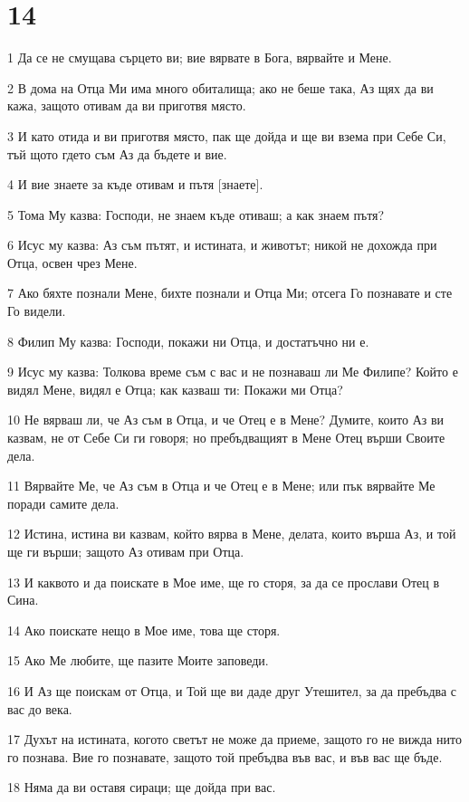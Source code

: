 \chapter{14}

\par 1 Да се не смущава сърцето ви; вие вярвате в Бога, вярвайте и Мене.
\par 2 В дома на Отца Ми има много обиталища; ако не беше така, Аз щях да ви кажа, защото отивам да ви приготвя място.
\par 3 И като отида и ви приготвя място, пак ще дойда и ще ви взема при Себе Си, тъй щото гдето съм Аз да бъдете и вие.
\par 4 И вие знаете за къде отивам и пътя [знаете].
\par 5 Тома Му казва: Господи, не знаем къде отиваш; а как знаем пътя?
\par 6 Исус му казва: Аз съм пътят, и истината, и животът; никой не дохожда при Отца, освен чрез Мене.
\par 7 Ако бяхте познали Мене, бихте познали и Отца Ми; отсега Го познавате и сте Го видели.
\par 8 Филип Му казва: Господи, покажи ни Отца, и достатъчно ни е.
\par 9 Исус му казва: Толкова време съм с вас и не познаваш ли Ме Филипе? Който е видял Мене, видял е Отца; как казваш ти: Покажи ми Отца?
\par 10 Не вярваш ли, че Аз съм в Отца, и че Отец е в Мене? Думите, които Аз ви казвам, не от Себе Си ги говоря; но пребъдващият в Мене Отец върши Своите дела.
\par 11 Вярвайте Ме, че Аз съм в Отца и че Отец е в Мене; или пък вярвайте Ме поради самите дела.
\par 12 Истина, истина ви казвам, който вярва в Мене, делата, които върша Аз, и той ще ги върши; защото Аз отивам при Отца.
\par 13 И каквото и да поискате в Мое име, ще го сторя, за да се прослави Отец в Сина.
\par 14 Ако поискате нещо в Мое име, това ще сторя.
\par 15 Ако Ме любите, ще пазите Моите заповеди.
\par 16 И Аз ще поискам от Отца, и Той ще ви даде друг Утешител, за да пребъдва с вас до века.
\par 17 Духът на истината, когото светът не може да приеме, защото го не вижда нито го познава. Вие го познавате, защото той пребъдва във вас, и във вас ще бъде.
\par 18 Няма да ви оставя сираци; ще дойда при вас.
